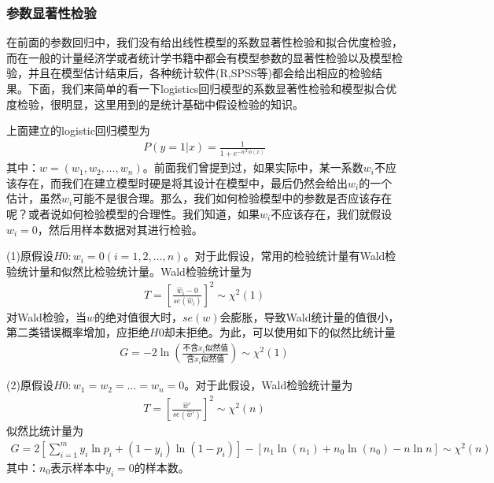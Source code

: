         \subsubsection{参数显著性检验}
            \par
            在前面的参数回归中，我们没有给出线性模型的系数显著性检验和拟合优度检验，而在一般的计量经济学或者统计学书籍中都会有模型参数的显著性检验以及模型检验，并且在模型估计结束后，各种统计软件(R,SPSS等)都会给出相应的检验结果。下面，我们来简单的看一下logistics回归模型的系数显著性检验和模型拟合优度检验，很明显，这里用到的是统计基础中假设检验的知识。
            \par
            上面建立的logistic回归模型为
            \begin{align*}
            P(y=1|x) = \frac{1}{1+e^{-w^\mathrm{T}\phi(x)}}
            \end{align*}
            其中：$w = (w_1,w_2,\dots,w_n)$。前面我们曾提到过，如果实际中，某一系数$w_i$不应该存在，而我们在建立模型时硬是将其设计在模型中，最后仍然会给出$w_i$的一个估计，虽然$w_i$可能不是很合理。那么，我们如何检验模型中的参数是否应该存在呢？或者说如何检验模型的合理性。我们知道，如果$w_i$不应该存在，我们就假设$w_i=0$，然后用样本数据对其进行检验。
            \par
            (1)原假设$H0:w_i = 0(i = 1,2,\dots,n)$。对于此假设，常用的检验统计量有Wald检验统计量和似然比检验统计量。Wald检验统计量为
            \begin{align*}
            T = \left[\frac{\hat{w}_i - 0}{se(\hat{w}_i)}\right]^2 \sim \chi^2(1)
            \end{align*}
            对Wald检验，当$w$的绝对值很大时，$se(w)$会膨胀，导致Wald统计量的值很小，第二类错误概率增加，应拒绝$H0$却未拒绝。为此，可以使用如下的似然比统计量
            \begin{align*}
            G = -2\ln \left( \frac{\text{不含}x_i\text{似然值}}{\text{含}x_i\text{似然值}} \right) \sim \chi^2(1)
            \end{align*}
            \par
            (2)原假设$H0:w_1 = w_2=\dots=w_n=0$。对于此假设，Wald检验统计量为
            \begin{align*}
            T = \left[\frac{\hat{w}'}{se(\hat{w}')}  \right]^2 \sim \chi^2(n)
            \end{align*}
            似然比统计量为
            \begin{align*}
            G = 2\left[ \sum_{i=1}^m y_i\ln p_i + (1-y_i)\ln (1-p_i)  \right] - [n_1\ln (n_1)+n_0\ln(n_0)-n\ln n] \sim \chi^2(n)
            \end{align*}
            其中：$n_0$表示样本中$y_i=0$的样本数。
